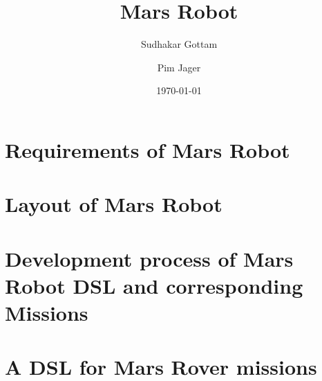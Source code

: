 \documentclass[titlepage]{article}
\author{%
	Sudhakar Gottam\and
	Pim Jager
}
\title{Mars Robot}
\date{\today}
\begin{document}
\maketitle
\tableofcontents
\newpage

\section{Requirements of Mars Robot} \label{sec:requirements}
 

\section{Layout of Mars Robot} \label{sec:layout}


\section{Development process of Mars Robot DSL and corresponding Missions}


\section{A DSL for Mars Rover missions}

\end{document}
